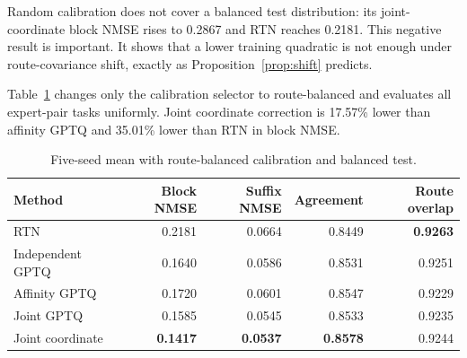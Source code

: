 \documentclass[11pt]{article}
\theoremstyle{plain}
\theoremstyle{definition}
\theoremstyle{remark}
\begin{document}
Random calibration does not cover a balanced test distribution: its joint-coordinate block NMSE rises to 0.2867 and RTN reaches 0.2181.  This negative result is important.  It shows that a lower training quadratic is not enough under route-covariance shift, exactly as Proposition~\ref{prop:shift} predicts.

Table~\ref{tab:balanced} changes only the calibration selector to route-balanced and evaluates all expert-pair tasks uniformly.  Joint coordinate correction is 17.57\% lower than affinity GPTQ and 35.01\% lower than RTN in block NMSE.

\begin{table}[h]
\centering
\small
\caption{Five-seed mean with route-balanced calibration and balanced test.}\label{tab:balanced}
\begin{tabular}{lrrrr}
\toprule
Method & Block NMSE & Suffix NMSE & Agreement & Route overlap \\
\midrule
RTN & 0.2181 & 0.0664 & 0.8449 & \textbf{0.9263} \\
Independent GPTQ & 0.1640 & 0.0586 & 0.8531 & 0.9251 \\
Affinity GPTQ & 0.1720 & 0.0601 & 0.8547 & 0.9229 \\
Joint GPTQ & 0.1585 & 0.0545 & 0.8533 & 0.9235 \\
Joint coordinate & \textbf{0.1417} & \textbf{0.0537} & \textbf{0.8578} & 0.9244 \\
\bottomrule
\end{tabular}
\end{table}
\end{document}
